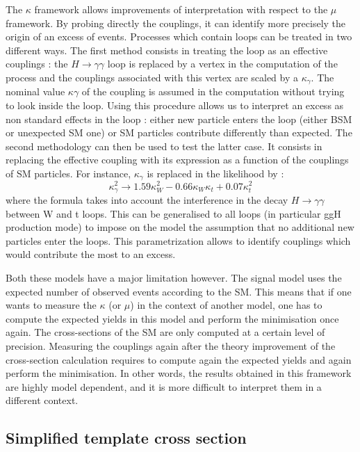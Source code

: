 The $\kappa$ framework allows improvements of interpretation with respect to the $\mu$ framework.
By probing directly the couplings, it can identify more precisely the origin of an excess of events.
Processes which contain loops can be treated in two different ways.
The first method consists in treating the loop as an effective couplings : the $H\rightarrow \gamma \gamma$ loop is replaced by a vertex in the computation of the process and the couplings associated with this vertex are scaled by a \(\kappa_{\gamma}\).
The nominal value $\kappa\gamma$ of the  coupling is assumed in the computation without trying to look inside the loop.
Using this procedure allows us to interpret an excess as non standard effects in the loop : either new particle enters the loop (either BSM or unexpected SM one) or SM particles contribute differently than expected.
The second methodology can then be used to test the latter case.
It consists in replacing the effective coupling with its expression as a function of the couplings of SM particles.
For instance, \(\kappa_{\gamma}\) is replaced \cite{LHCHXSWG-2012-001,ATLAS-CONF-2014-009,CERN-EP-2016-100} in the likelihood by :
\begin{equation}
\kappa_\gamma^2 \rightarrow 1.59\kappa_W^2 -0.66\kappa_W\kappa_t + 0.07\kappa_t^2
\end{equation}
where the formula takes into account the interference in the decay $H\rightarrow\gamma\gamma$ between W and t loops.
This can be generalised to all loops (in particular ggH production mode) to impose on the model the assumption that no additional new particles enter the loops.
This parametrization allows to identify couplings which would contribute the most to an excess.

Both these models have a major limitation however.
The signal model uses the expected number of observed events according to the SM.
This means that if one wants to measure the $\kappa$ (or $\mu$) in the context of another model, one has to compute the expected yields in this model and perform the minimisation once again.
The cross-sections of the SM are only computed at a certain level of precision.
Measuring the couplings again after the theory improvement of the cross-section calculation requires to compute again the expected yields and again perform the minimisation.
In other words, the results obtained in this framework are highly model dependent, and it is more difficult to interpret them in a different context.

\subsection{Simplified template cross section}
\label{sec:orgeaa3f29}
\label{sec:HGam_STXS}

